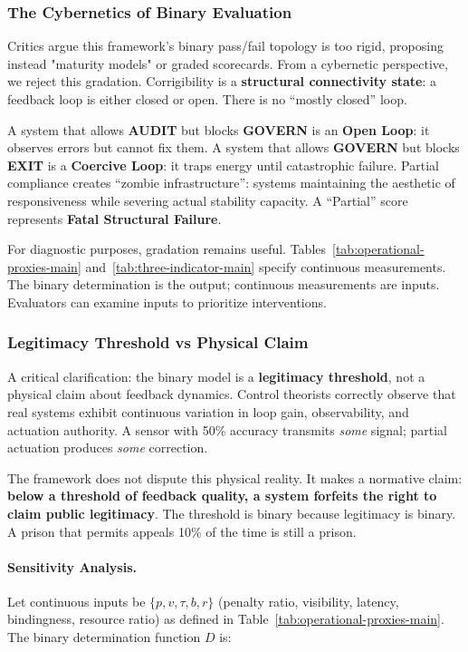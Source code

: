 \documentclass{article}
\begin{document}
\subsubsection{The Cybernetics of Binary Evaluation}

Critics argue this framework's binary pass/fail topology is too rigid, proposing instead "maturity models" or graded scorecards. From a cybernetic perspective, we reject this gradation. Corrigibility is a \textbf{structural connectivity state}: a feedback loop is either closed or open. There is no ``mostly closed'' loop.

A system that allows \textbf{AUDIT} but blocks \textbf{GOVERN} is an \textbf{Open Loop}: it observes errors but cannot fix them. A system that allows \textbf{GOVERN} but blocks \textbf{EXIT} is a \textbf{Coercive Loop}: it traps energy until catastrophic failure. Partial compliance creates ``zombie infrastructure'': systems maintaining the aesthetic of responsiveness while severing actual stability capacity. A ``Partial'' score represents \textbf{Fatal Structural Failure}.

For diagnostic purposes, gradation remains useful. Tables~\ref{tab:operational-proxies-main} and~\ref{tab:three-indicator-main} specify continuous measurements. The binary determination is the output; continuous measurements are inputs. Evaluators can examine inputs to prioritize interventions.

\subsubsection{Legitimacy Threshold vs Physical Claim}

A critical clarification: the binary model is a \textbf{legitimacy threshold}, not a physical claim about feedback dynamics. Control theorists correctly observe that real systems exhibit continuous variation in loop gain, observability, and actuation authority. A sensor with 50\% accuracy transmits \textit{some} signal; partial actuation produces \textit{some} correction.

The framework does not dispute this physical reality. It makes a normative claim: \textbf{below a threshold of feedback quality, a system forfeits the right to claim public legitimacy}. The threshold is binary because legitimacy is binary. A prison that permits appeals 10\% of the time is still a prison.

\paragraph{Sensitivity Analysis.} Let continuous inputs be $\{p, v, \tau, b, r\}$ (penalty ratio, visibility, latency, bindingness, resource ratio) as defined in Table~\ref{tab:operational-proxies-main}. The binary determination function $D$ is:
\end{document}
